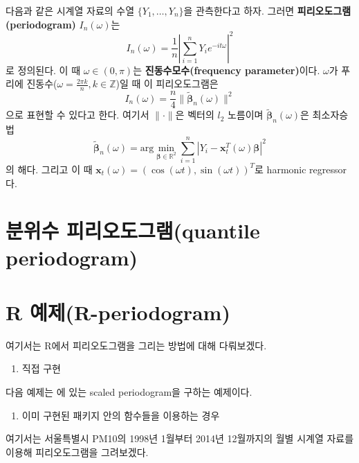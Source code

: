 \documentclass[b5paper,]{scrbook}
\providecommand{\tightlist}{%
  \setlength{\itemsep}{0pt}\setlength{\parskip}{0pt}}
\theoremstyle{plain}
\theoremstyle{definition}
\numberwithin{equation}{section}
\begin{document}
다음과 같은 시계열 자료의 수열 \(\{Y_{1}, \ldots, Y_{n}\}\)을 관측한다고
하자. 그러면 \textbf{피리오도그램(periodogram)} \(I_{n}(\omega)\)는
\[I_{n}(\omega)=\frac{1}{n}| \sum_{i=1}^{n}Y_{i}e^{-it\omega}|^{2}\] 로
정의된다. 이 때 \(\omega\in (0,\pi)\)는 \textbf{진동수모수(frequency
parameter)}이다. \(\omega\)가 푸리에
진동수(\(\omega=\frac{2\pi k}{n}, k\in\mathbb{Z}\))일 때 이
피리오도그램은
\[I_{n}(\omega)=\frac{n}{4}\| \tilde{\boldsymbol{\beta}}_{n}(\omega)\|^{2}\]
으로 표현할 수 있다고 한다\citep{Li2008}. 여기서 \(\| \cdot \|\)은
벡터의 \(l_{2}\) 노름이며 \(\tilde{\boldsymbol{\beta}}_{n}(\omega)\)은
최소자승법
\[\tilde{\boldsymbol{\beta}}_{n}(\omega)=\text{arg}\min_{\boldsymbol{\beta}\in\mathbb{R}^{2}}\sum_{i=1}^{n}| Y_{i}-\mathbf{x}_{t}^{T}(\omega)\boldsymbol{\beta}|^{2}\]
의 해다. 그리고 이 때
\(\mathbf{x}_{t}(\omega)=(\cos(\omega t), \sin (\omega t))^{T}\)로
harmonic regressor다.

\section{분위수 피리오도그램(quantile
periodogram)}\label{-quantile-periodogram}

\section{R 예제(R-periodogram)}\label{r-r-periodogram}

여기서는 R에서 피리오도그램을 그리는 방법에 대해 다뤄보겠다.

\begin{enumerate}
\def\labelenumi{\arabic{enumi}.}
\tightlist
\item
  직접 구현
\end{enumerate}

다음 예제는 \citep{Shumway2010}에 있는 scaled periodogram을 구하는
예제이다.

\begin{enumerate}
\def\labelenumi{\arabic{enumi}.}
\setcounter{enumi}{1}
\tightlist
\item
  이미 구현된 패키지 안의 함수들을 이용하는 경우
\end{enumerate}

여기서는 서울특별시 PM10의 1998년 1월부터 2014년 12월까지의 월별 시계열
자료를 이용해 피리오도그램을 그려보겠다.
\end{document}
